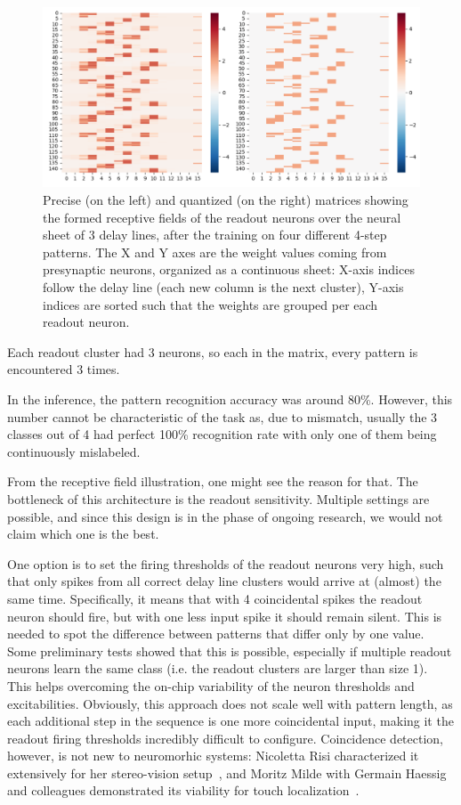 \begin{figure}[h]
  \centering
    \includegraphics[width=.8\linewidth]{img/chapter5/temporal_pattern_receptive_fields.png}
    \caption[Receptive fields of the readout neurons showing overlapping temporal patterns]{Precise (on the left) and quantized (on the right) matrices showing the formed receptive fields of the readout neurons over the neural sheet of 3 delay lines, after the training on four different 4-step patterns. The X and Y axes are the weight values coming from presynaptic neurons, organized as a continuous sheet: X-axis indices follow the delay line (each new column is the next cluster), Y-axis indices are sorted such that the weights are grouped per each readout neuron.}
  \label{fig:temporal_pattern_receptive_fields}
\end{figure}

Each readout cluster had 3 neurons, so each in the matrix, every pattern is encountered 3 times.

In the inference, the pattern recognition accuracy was around 80\%. However, this number cannot be characteristic of the task as, due to mismatch, usually the 3 classes out of 4 had perfect 100\% recognition rate with only one of them being continuously mislabeled.

From the receptive field illustration, one might see the reason for that. The bottleneck of this architecture is the readout sensitivity. Multiple settings are possible, and since this design is in the phase of ongoing research, we would not claim which one is the best.

One option is to set the firing thresholds of the readout neurons very high, such that only spikes from all correct delay line clusters would arrive at (almost) the same time. Specifically, it means that with 4 coincidental spikes the readout neuron should fire, but with one less input spike it should remain silent. This is needed to spot the difference between patterns that differ only by one value. Some preliminary tests showed that this is possible, especially if multiple readout neurons learn the same class (i.e. the readout clusters are larger than size 1). This helps overcoming the on-chip variability of the neuron thresholds and excitabilities.
Obviously, this approach does not scale well with pattern length, as each additional step in the sequence is one more coincidental input, making it the readout firing thresholds incredibly difficult to configure. Coincidence detection, however, is not new to neuromorhic systems: Nicoletta Risi characterized it extensively for her stereo-vision setup~\cite{Risi_etal21}, and Moritz Milde with Germain Haessig and colleagues demonstrated its viability for touch localization~\cite{Haessig_etal20}.

